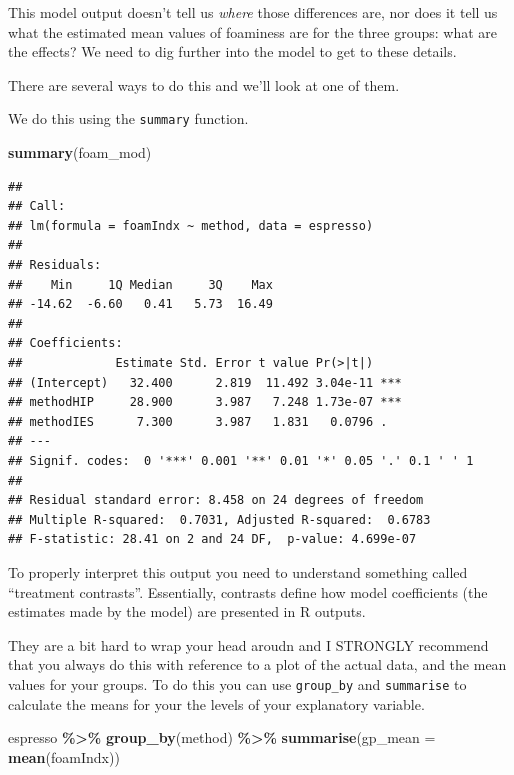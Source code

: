 \documentclass[
  a4paperpaper,
]{book}
\newenvironment{Shaded}{\begin{snugshade}}{\end{snugshade}}
\newcommand{\DataTypeTok}[1]{\textcolor[rgb]{0.13,0.29,0.53}{#1}}
\newcommand{\KeywordTok}[1]{\textcolor[rgb]{0.13,0.29,0.53}{\textbf{#1}}}
\newcommand{\NormalTok}[1]{#1}
\newcommand{\OperatorTok}[1]{\textcolor[rgb]{0.81,0.36,0.00}{\textbf{#1}}}
\begin{document}
This model output doesn't tell us \emph{where} those differences are, nor does it tell us what the estimated mean values of foaminess are for the three groups: what are the effects? We need to dig further into the model to get to these details.

There are several ways to do this and we'll look at one of them.

We do this using the \texttt{summary} function.

\begin{Shaded}
\begin{Highlighting}[]
\KeywordTok{summary}\NormalTok{(foam\_mod)}
\end{Highlighting}
\end{Shaded}

\begin{verbatim}
## 
## Call:
## lm(formula = foamIndx ~ method, data = espresso)
## 
## Residuals:
##    Min     1Q Median     3Q    Max 
## -14.62  -6.60   0.41   5.73  16.49 
## 
## Coefficients:
##             Estimate Std. Error t value Pr(>|t|)    
## (Intercept)   32.400      2.819  11.492 3.04e-11 ***
## methodHIP     28.900      3.987   7.248 1.73e-07 ***
## methodIES      7.300      3.987   1.831   0.0796 .  
## ---
## Signif. codes:  0 '***' 0.001 '**' 0.01 '*' 0.05 '.' 0.1 ' ' 1
## 
## Residual standard error: 8.458 on 24 degrees of freedom
## Multiple R-squared:  0.7031,	Adjusted R-squared:  0.6783 
## F-statistic: 28.41 on 2 and 24 DF,  p-value: 4.699e-07
\end{verbatim}

To properly interpret this output you need to understand something called ``treatment contrasts''. Essentially, contrasts define how model coefficients (the estimates made by the model) are presented in R outputs.

They are a bit hard to wrap your head aroudn and I STRONGLY recommend that you always do this with reference to a plot of the actual data, and the mean values for your groups. To do this you can use \texttt{group\_by} and \texttt{summarise} to calculate the means for your the levels of your explanatory variable.

\begin{Shaded}
\begin{Highlighting}[]
\NormalTok{espresso }\OperatorTok{\%\textgreater{}\%}
\KeywordTok{group\_by}\NormalTok{(method) }\OperatorTok{\%\textgreater{}\%}
\KeywordTok{summarise}\NormalTok{(}\DataTypeTok{gp\_mean =} \KeywordTok{mean}\NormalTok{(foamIndx))}
\end{Highlighting}
\end{Shaded}
\end{document}

